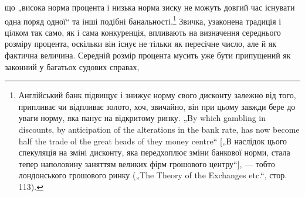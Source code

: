 що „висока норма процента і низька норма зиску не можуть
довгий час існувати одна поряд одної“ та інші подібні банальності.\footnote{
Англійський банк підвищує і знижує норму свого дисконту залежно від
того, припливає чи відпливає золото, хоч, звичайно, він при цьому завжди бере
до уваги норму, яка панує на відкритому ринку. „By which gambling in discounts,
by anticipation of the alterations in the bank rate, has now become half the trade
ol the great heads of they money centre“ [„В наслідок цього спекуляція на зміні
дисконту, яка передхоплює зміни банкової норми, стала тепер наполовину
заняттям великих фірм грошового центру“], — тобто лондонського грошового
ринку („The Theory of the Exchanges etc.“, стор. 113).
}
Звичка, узаконена традиція і~ цілком так само, як
і сама конкуренція, впливають на визначення середнього розміру
процента, оскільки він існує не тільки як пересічне число,
але й як фактична величина. Середній розмір процента мусить
уже бути припущений як законний у багатьох судових справах,
\parbreak{}  %
